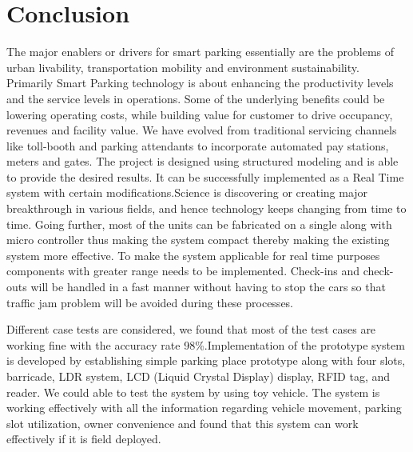 \documentclass[12pt,a4paper]{report}
\begin{document}
\section{Conclusion}
The major enablers or drivers for smart parking essentially are the problems of urban livability, transportation mobility and environment sustainability. Primarily Smart Parking technology is about enhancing the productivity levels and the service levels in operations. Some of the underlying benefits could be lowering operating costs, while building value for customer to drive occupancy, revenues and facility value. We have evolved from traditional servicing channels like toll-booth and parking attendants to incorporate automated pay stations, meters and gates. The project is designed using structured modeling and is able to provide the desired results. It can be successfully implemented as a Real Time system with certain modifications.Science is discovering or creating major breakthrough in various fields, and hence technology keeps changing from time to time. Going further, most of the units can be fabricated on a single along with micro controller thus making the system compact thereby making the existing system more effective. To make the system applicable for real time purposes components with greater range needs to be implemented. 
Check-ins and check-outs will be handled in a fast manner without having to stop the cars so that traffic jam problem will be avoided during these processes.

Different case tests are considered, we found that most of the test cases are working fine with the accuracy rate 98\%.Implementation of the prototype system is developed by establishing simple
parking place prototype along with four slots, barricade, LDR system, LCD (Liquid
Crystal Display) display, RFID tag, and reader. We could able to test the system by
using toy vehicle. The system is working effectively with all the information
regarding vehicle movement, parking slot utilization, owner convenience and found
that this system can work effectively if it is field deployed.

 
\end{document}

